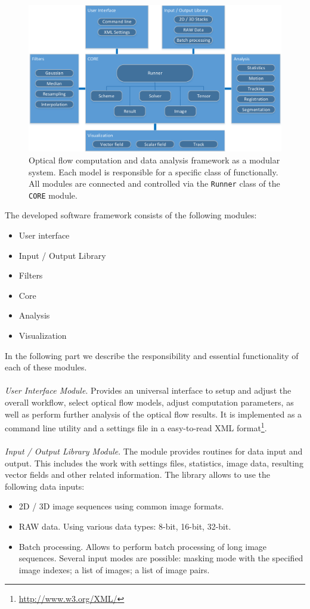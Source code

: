 \begin{figure}[h]
	\centering
	\includegraphics[scale=0.87]{figures/software_scheme.pdf}
	\caption{Optical flow computation and data analysis framework as a modular system. Each model is responsible for a specific class of functionally.  All modules are connected and controlled via the \texttt{Runner} class of the \texttt{CORE} module.}
	\label{fig:software_scheme}
\end{figure}

The developed software framework consists of the following modules:
\begin{itemize}
	\item User interface
	\item Input / Output Library
	\item Filters
	\item Core
	\item Analysis
	\item Visualization	
\end{itemize}

In the following part we describe the responsibility and essential functionality of each of these modules.
\\
\\
\textit{User Interface Module}. Provides an universal interface to setup and adjust the overall workflow, select optical flow models, adjust computation parameters, as well as perform further analysis of the optical flow results. It is implemented as a command line utility and a settings file in a easy-to-read XML format\footnote{\url{http://www.w3.org/XML/}}. 
\\
\\
\textit{Input / Output Library Module}. The module provides routines for data input and output. This includes the work with settings files, statistics, image data, resulting vector fields and other related information. The library allows to use the following data inputs:
\begin{itemize}
	\item 2D / 3D image sequences using common image formats.
	\item RAW data. Using various data types: 8-bit, 16-bit, 32-bit. 
	\item Batch processing. Allows to perform batch processing of long image sequences. Several input modes are possible: masking mode with the specified image indexes; a list of images; a list of image pairs. 
\end{itemize}

